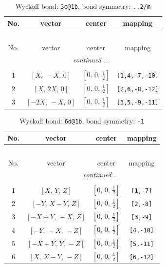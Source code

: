 \documentclass[fleqn,8pt]{jsarticle}
\begin{document}
\begin{longtable}{cccc}
\caption{Wyckoff bond: {\tt 3c@1b}, bond symmetry: {\tt ..2/m}}
 \\
 \hline \hline
No. & vector & center & mapping \\ \hline \endfirsthead

\multicolumn{3}{l}{\tablename\ \thetable{}} \\
 \hline \hline
No. & vector & center & mapping \\ \hline \endhead

 \hline \hline
\multicolumn{3}{r}{\footnotesize\it continued ...} \\ \endfoot

 \hline \hline
\multicolumn{3}{r}{} \\ \endlastfoot

1 & $\left[ X,\, - X,\, 0 \right]$ & $\left[ 0,\, 0,\, \frac{1}{2} \right]$ & {\tt [1,4,-7,-10]} \\ \hline
2 & $\left[ X,\, 2 X,\, 0 \right]$ & $\left[ 0,\, 0,\, \frac{1}{2} \right]$ & {\tt [2,6,-8,-12]} \\ \hline
3 & $\left[ - 2 X,\, - X,\, 0 \right]$ & $\left[ 0,\, 0,\, \frac{1}{2} \right]$ & {\tt [3,5,-9,-11]} \\
\end{longtable}
\renewcommand{\arraystretch}{1.2}
\begin{longtable}{cccc}
\caption{Wyckoff bond: {\tt 6d@1b}, bond symmetry: {\tt -1}}
 \\
 \hline \hline
No. & vector & center & mapping \\ \hline \endfirsthead

\multicolumn{3}{l}{\tablename\ \thetable{}} \\
 \hline \hline
No. & vector & center & mapping \\ \hline \endhead

 \hline \hline
\multicolumn{3}{r}{\footnotesize\it continued ...} \\ \endfoot

 \hline \hline
\multicolumn{3}{r}{} \\ \endlastfoot

1 & $\left[ X,\, Y,\, Z \right]$ & $\left[ 0,\, 0,\, \frac{1}{2} \right]$ & {\tt [1,-7]} \\ \hline
2 & $\left[ - Y,\, X - Y,\, Z \right]$ & $\left[ 0,\, 0,\, \frac{1}{2} \right]$ & {\tt [2,-8]} \\ \hline
3 & $\left[ - X + Y,\, - X,\, Z \right]$ & $\left[ 0,\, 0,\, \frac{1}{2} \right]$ & {\tt [3,-9]} \\ \hline
4 & $\left[ - Y,\, - X,\, - Z \right]$ & $\left[ 0,\, 0,\, \frac{1}{2} \right]$ & {\tt [4,-10]} \\ \hline
5 & $\left[ - X + Y,\, Y,\, - Z \right]$ & $\left[ 0,\, 0,\, \frac{1}{2} \right]$ & {\tt [5,-11]} \\ \hline
6 & $\left[ X,\, X - Y,\, - Z \right]$ & $\left[ 0,\, 0,\, \frac{1}{2} \right]$ & {\tt [6,-12]} \\
\end{longtable}
\end{document}
